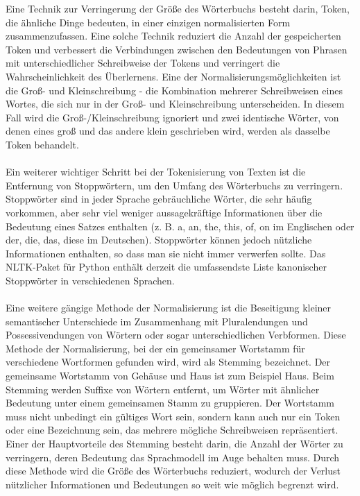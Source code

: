 Eine Technik zur Verringerung der Größe des Wörterbuchs besteht darin, Token, die ähnliche Dinge bedeuten, in einer einzigen normalisierten Form zusammenzufassen. 
Eine solche Technik reduziert die Anzahl der gespeicherten Token und verbessert die Verbindungen zwischen den Bedeutungen von Phrasen mit unterschiedlicher \glqq{}Schreibweise\grqq{} der Tokens und verringert die Wahrscheinlichkeit des Überlernens. 
Eine der Normalisierungsmöglichkeiten ist die Groß- und Kleinschreibung - die Kombination mehrerer Schreibweisen eines Wortes, die sich nur in der Groß- und Kleinschreibung unterscheiden. 
In diesem Fall wird die Groß-/Kleinschreibung ignoriert und zwei identische Wörter, von denen eines groß und das andere klein geschrieben wird, werden als dasselbe Token behandelt.\\\\
Ein weiterer wichtiger Schritt bei der Tokenisierung von Texten ist die Entfernung von Stoppwörtern, um den Umfang des Wörterbuchs zu verringern. 
Stoppwörter sind in jeder Sprache gebräuchliche Wörter, die sehr häufig vorkommen, aber sehr viel weniger aussagekräftige Informationen über die Bedeutung eines Satzes enthalten (z. B. a, an, the, this, of, on im Englischen oder der, die, das, diese im Deutschen). 
Stoppwörter können jedoch nützliche Informationen enthalten, so dass man sie nicht immer verwerfen sollte. 
Das \ac{NLTK}-Paket für Python enthält derzeit die umfassendste Liste kanonischer Stoppwörter in verschiedenen Sprachen.\\\\
Eine weitere gängige Methode der Normalisierung ist die Beseitigung kleiner semantischer Unterschiede im Zusammenhang mit Pluralendungen und Possessivendungen von Wörtern oder sogar unterschiedlichen Verbformen. 
Diese Methode der Normalisierung, bei der ein gemeinsamer Wortstamm für verschiedene Wortformen gefunden wird, wird als Stemming bezeichnet. 
Der gemeinsame Wortstamm von \glqq{}Gehäuse\grqq{} und \glqq{}Haus\grqq{} ist zum Beispiel \glqq{}Haus\grqq{}.
 Beim Stemming werden Suffixe von Wörtern entfernt, um Wörter mit ähnlicher Bedeutung unter einem gemeinsamen Stamm zu gruppieren. 
 Der Wortstamm muss nicht unbedingt ein gültiges Wort sein, sondern kann auch nur ein Token oder eine Bezeichnung sein, das mehrere mögliche Schreibweisen repräsentiert. 
 Einer der Hauptvorteile des Stemming besteht darin, die Anzahl der Wörter zu verringern, deren Bedeutung das Sprachmodell im Auge behalten muss. 
 Durch diese Methode wird die Größe des Wörterbuchs reduziert, wodurch der Verlust nützlicher Informationen und Bedeutungen so weit wie möglich begrenzt wird. 
